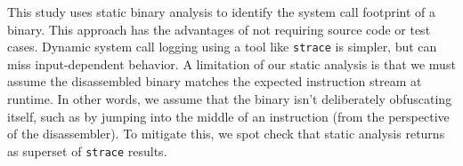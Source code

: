 \begin{comment}
Formally, \compatmetric{} is the expected fraction of packages on a given system($\mathtt{Inst}$)
having an API footprint within the target 
system's supported APIs.
By assuming independence of package installation, we can calculate the probability of supporting an installation as follows:
\begin{align*}
&\mathtt{Weighted Compliance}(\mathtt{API}_\mathtt{Supported}) =\\
&E(\frac{|\mathtt{Pkg}_\mathtt{Supported} \bigcap \mathtt{Inst}|}{|\mathtt{Inst}|}) \sim \frac{E(|\mathtt{Pkg}_\mathtt{Supported} \bigcap \mathtt{Inst}|)}{E(|\mathtt{Inst}|)} \\
&\sim \frac{\sum_{\mathtt{pkg} \in \mathtt{Pkg}_\mathtt{Supported}} (\frac{\text{installation of $\mathtt{pkg}$}}{\text{total installation}})}{\sum_{\mathtt{pkg} \in \mathtt{Pkg}_\mathtt{all\hspace{0.21in}}} (\frac{\text{installation of $\mathtt{pkg}$}}{\text{total installation}})} \\
&\text{where E}(\mathtt{x})\text{ is the Expectation of }\mathtt{x}\text{ occurring.}
\end{align*}
\end{comment}


\label{sec:metric:collection}

This study uses static binary analysis to identify the
system call footprint of a binary.  This approach has the advantages
of not requiring source code or test cases.  Dynamic system call logging using a tool like {\tt strace} is simpler,
but can miss input-dependent behavior.  A limitation of our static analysis is that we must assume the disassembled binary
matches the expected instruction stream at runtime.  In other words, we assume that the binary isn't deliberately obfuscating
itself, such as by jumping into the middle of an instruction (from the perspective of the disassembler).
To mitigate this, we spot check that static analysis returns as superset of {\tt strace} results.

